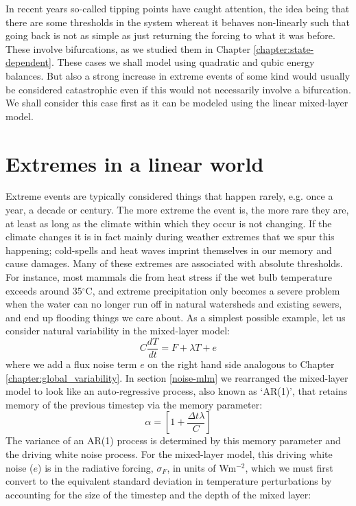 \documentclass[12pt]{book}
\begin{document}
In recent years so-called tipping points have caught attention, the idea being that there are some thresholds in the system whereat it behaves non-linearly such that going back is not as simple as just returning the forcing to what it was before. These involve bifurcations, as we studied them in Chapter \ref{chapter:state-dependent}. These cases we shall model using quadratic and qubic energy balances. 
But also a strong increase in extreme events of some kind would usually be considered catastrophic even if this would not necessarily involve a bifurcation. We shall consider this case first as it can be modeled using the linear mixed-layer model.



\section{Extremes in a linear world}
Extreme events are typically considered things that happen rarely, e.g. once a year, a decade or century. The more extreme the event is, the more rare they are, at least as long as the climate within which they occur is not changing. 
If the climate changes it is in fact mainly during weather extremes that we spur this happening; cold-spells and heat waves imprint themselves in our memory and cause damages. Many of these extremes are associated with absolute thresholds. For instance, most mammals die from heat stress if the wet bulb temperature exceeds around 35$^\circ$C, and extreme precipitation only becomes a severe problem when the water can no longer run off in natural watersheds and existing sewers, and end up flooding things we care about. %
As a simplest possible example, let us consider natural variability in the mixed-layer model:
$$ C\frac{dT}{dt} = F + \lambda T + e $$
\noindent where we add a flux noise term $e$ on the right hand side analogous to Chapter \ref{chapter:global_variability}. 
In section \ref{noise-mlm} we rearranged the mixed-layer model to look like an auto-regressive process, also known as `AR(1)', that retains memory of the previous timestep via the memory parameter:
\begin{equation}
	\alpha = \left[1 + \frac{\Delta t \lambda }{C}  \right] 
\end{equation}
\noindent The variance of an AR(1) process is determined by this memory parameter and the driving white noise process. For the mixed-layer model, this driving white noise ($e$) is in the radiative forcing, $\sigma_F$, in units of Wm$^{-2}$, which we must first convert to the equivalent standard deviation in temperature perturbations by accounting for the size of the timestep and the depth of the mixed layer:
\end{document}
